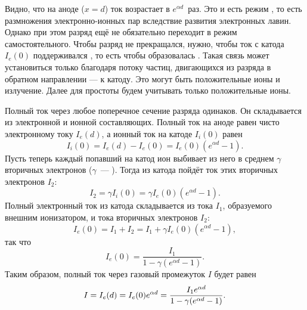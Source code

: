 \begin{labsupplement}
Видно, что на аноде ($x=d$) ток возрастает в $e^{\alpha d}$~раз.
Это и есть режим , то есть размножения
электронно-ионных пар вследствие развития
электронных лавин. Однако при этом разряд ещё не обязательно переходит в режим
самостоятельного. Чтобы разряд не прекращался, нужно,
чтобы ток с катода $I_e(0)$ поддерживался ,
то есть чтобы образовалась .
Такая связь может установиться только благодаря потоку частиц, двигающихся
из разряда в обратном направлении --- к катоду. Это могут быть 
положительные ионы и излучение. 
Далее для простоты будем учитывать только положительные ионы.

Полный ток через любое поперечное сечение разряда одинаков.
Он складывается из электронной и ионной составляющих.
Полный ток на аноде равен чисто электронному току $I_e(d)$,
а ионный ток на катоде $I_i(0)$ равен
\begin{equation*}
	I_i(0)=I_e(d)-I_e(0)=I_e(0)(e^{\alpha d}-1).
\end{equation*}
Пусть теперь каждый попавший на катод ион выбивает из него в среднем
$\gamma$ вторичных электронов
($\gamma$~--- ).
Тогда из катода пойдёт ток этих вторичных электронов $I_2$:
\begin{equation*}
	I_2=\gamma I_i(0)=\gamma I_e(0)(e^{\alpha d}-1).
\end{equation*}
Полный электронный ток из катода складывается из тока $I_1$,
образуемого внешним ионизатором, и тока вторичных электронов $I_2$:
\begin{equation*}
	I_e(0)=I_1+I_2=I_1+\gamma I_e(0)(e^{\alpha d}-1),
\end{equation*}
так что
\begin{equation*}
	I_e(0)=\frac{I_1}{1-\gamma(e^{\alpha d}-1)}.
\end{equation*}
Таким образом, полный ток через газовый промежуток $I$ будет равен
\begin{equation}
    \eqmark{taunsendI}
	I=I_e(d)=I_e(0)e^{\alpha d}=\frac{I_1e^{\alpha d}}{1-\gamma(e^{\alpha
d}-1)}.
\end{equation}


\end{labsupplement}
